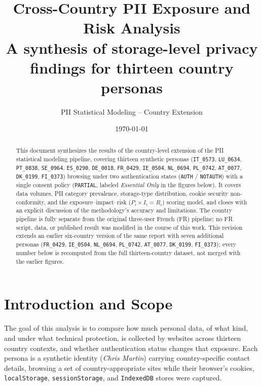 \documentclass[11pt,a4paper]{article}
\title{\textbf{Cross-Country PII Exposure and Risk Analysis}\\
\large A synthesis of storage-level privacy findings for thirteen country personas}
\author{PII Statistical Modeling -- Country Extension}
\date{\today}
\newcommand{\code}[1]{\texttt{#1}}
\begin{document}
\maketitle

\begin{abstract}
\noindent
This document synthesizes the results of the country-level extension of the PII
statistical modeling pipeline, covering thirteen synthetic personas
(\code{IT\_0573}, \code{LU\_0634}, \code{PT\_0838}, \code{SE\_0964}, \code{ES\_0290}, \code{DE\_0018}, \code{FR\_0429}, \code{IE\_0504}, \code{NL\_0694}, \code{PL\_0742}, \code{AT\_0077}, \code{DK\_0199}, \code{FI\_0373}) browsing under two authentication states
(\code{AUTH} / \code{NOTAUTH}) with a single consent policy
(\code{PARTIAL}, labeled \emph{Essential Only} in the figures below). It covers data
volumes, PII category prevalence, storage-type distribution, cookie security
non-conformity, and the exposure--impact--risk ($P_i \times I_i = R_i$) scoring
model, and closes with an explicit discussion of the methodology's accuracy
and limitations. The country pipeline is fully separate from the original
three-user French (FR) pipeline; no FR script, data, or published result was
modified in the course of this work. This revision extends an earlier
six-country version of the same report with seven additional personas
(\code{FR\_0429}, \code{IE\_0504}, \code{NL\_0694}, \code{PL\_0742},
\code{AT\_0077}, \code{DK\_0199}, \code{FI\_0373}); every number below is
recomputed from the full thirteen-country dataset, not merged with the earlier figures.
\end{abstract}

\tableofcontents

\section{Introduction and Scope}

The goal of this analysis is to compare how much personal data, of what kind,
and under what technical protection, is collected by websites across
thirteen country contexts, and whether authentication status changes that
exposure. Each persona is a synthetic identity (\emph{Chris Martin}) carrying
country-specific contact details, browsing a set of country-appropriate sites
while their browser's cookies, \code{localStorage}, \code{sessionStorage}, and
\code{IndexedDB} stores were captured.
\end{document}
